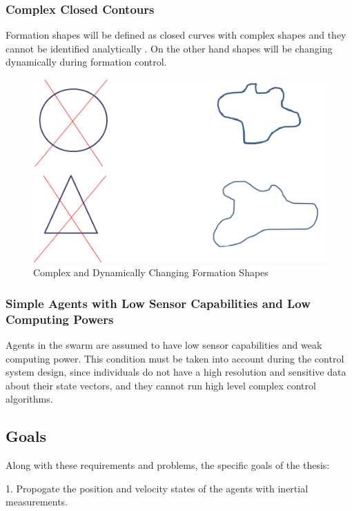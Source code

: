 \documentclass[twoside]{article}
\begin{document}
\subsubsection{Complex Closed Contours}
Formation shapes will be defined as closed curves with complex shapes and they cannot be identified analytically . On the other hand shapes will be changing dynamically during formation control. 

\begin{figure}[H]
	\caption{Complex and Dynamically Changing Formation Shapes}
	\centering
	\includegraphics[scale = 1]{complex}
\end{figure} 



\subsubsection{Simple Agents with Low Sensor Capabilities and Low Computing Powers}


Agents in the swarm are assumed to have low sensor capabilities and weak computing power. This 
condition must be taken into account during the control system design, since individuals do not have a high resolution and sensitive data about their state vectors, and they cannot run high level complex control algorithms.


\subsection{Goals}

Along with these requirements and problems, the specific goals of the thesis:

1. Propogate the position and velocity states of the agents with inertial measurements.
\end{document}
